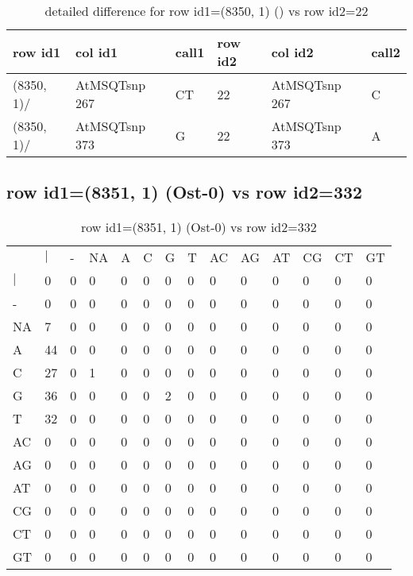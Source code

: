 \begin{center}
\begin{longtable}{|l|l|l|l|l|l|}
\caption{detailed difference for row id1=(8350, 1) () vs row id2=22} \label{table_dm365}\\
\hline
row id1&col id1&call1&row id2&col id2&call2\\
\hline
(8350, 1)/&AtMSQTsnp 267&CT&22&AtMSQTsnp 267&C\\
(8350, 1)/&AtMSQTsnp 373&G&22&AtMSQTsnp 373&A\\
\hline
\end{longtable}
\end{center}

\subsection{row id1=(8351, 1) (Ost-0) vs row id2=332}
\begin{center}
\begin{longtable}{|l|l|l|l|l|l|l|l|l|l|l|l|l|l|}
\caption{row id1=(8351, 1) (Ost-0) vs row id2=332} \label{table_dm366}\\
\hline
\\
\hline
&$|$&-&NA&A&C&G&T&AC&AG&AT&CG&CT&GT\\
$|$&0&0&0&0&0&0&0&0&0&0&0&0&0\\
-&0&0&0&0&0&0&0&0&0&0&0&0&0\\
NA&7&0&0&0&0&0&0&0&0&0&0&0&0\\
A&44&0&0&0&0&0&0&0&0&0&0&0&0\\
C&27&0&1&0&0&0&0&0&0&0&0&0&0\\
G&36&0&0&0&0&2&0&0&0&0&0&0&0\\
T&32&0&0&0&0&0&0&0&0&0&0&0&0\\
AC&0&0&0&0&0&0&0&0&0&0&0&0&0\\
AG&0&0&0&0&0&0&0&0&0&0&0&0&0\\
AT&0&0&0&0&0&0&0&0&0&0&0&0&0\\
CG&0&0&0&0&0&0&0&0&0&0&0&0&0\\
CT&0&0&0&0&0&0&0&0&0&0&0&0&0\\
GT&0&0&0&0&0&0&0&0&0&0&0&0&0\\
\hline
\end{longtable}
\end{center}

